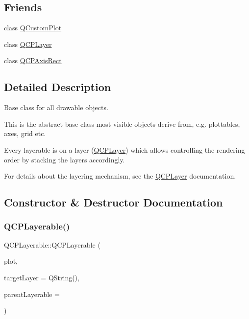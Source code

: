 \subsection*{Friends}
\begin{DoxyCompactItemize}
\item 
class \mbox{\hyperlink{class_q_c_p_layerable_a1cdf9df76adcfae45261690aa0ca2198}{Q\+Custom\+Plot}}
\item 
class \mbox{\hyperlink{class_q_c_p_layerable_a5dbf96bf7664c1b6fce49063eeea6eef}{Q\+C\+P\+Layer}}
\item 
class \mbox{\hyperlink{class_q_c_p_layerable_acbf20ecb140f66c5fd1bc64ae0762990}{Q\+C\+P\+Axis\+Rect}}
\end{DoxyCompactItemize}


\subsection{Detailed Description}
Base class for all drawable objects. 

This is the abstract base class most visible objects derive from, e.\+g. plottables, axes, grid etc.

Every layerable is on a layer (\mbox{\hyperlink{class_q_c_p_layer}{Q\+C\+P\+Layer}}) which allows controlling the rendering order by stacking the layers accordingly.

For details about the layering mechanism, see the \mbox{\hyperlink{class_q_c_p_layer}{Q\+C\+P\+Layer}} documentation. 

\subsection{Constructor \& Destructor Documentation}
\mbox{\label{class_q_c_p_layerable_a74c0fa237f29bf0e49565013fc5d1ec0}} 
\subsubsection{\texorpdfstring{QCPLayerable()}{QCPLayerable()}}
{\footnotesize\ttfamily Q\+C\+P\+Layerable\+::\+Q\+C\+P\+Layerable (\begin{DoxyParamCaption}\item[{\mbox{\hyperlink{class_q_custom_plot}{Q\+Custom\+Plot}} $\ast$}]{plot,  }\item[{Q\+String}]{target\+Layer = {\ttfamily QString()},  }\item[{\mbox{\hyperlink{class_q_c_p_layerable}{Q\+C\+P\+Layerable}} $\ast$}]{parent\+Layerable = {} }\end{DoxyParamCaption})}

